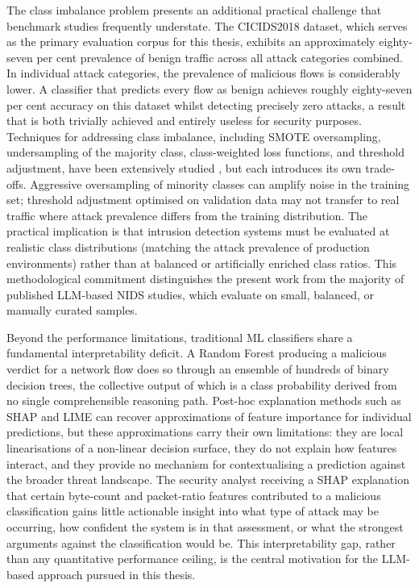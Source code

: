 \documentclass[../main.tex]{subfiles}
\begin{document}
The class imbalance problem presents an additional practical challenge that benchmark studies frequently understate. The CICIDS2018 dataset, which serves as the primary evaluation corpus for this thesis, exhibits an approximately eighty-seven per cent prevalence of benign traffic across all attack categories combined. In individual attack categories, the prevalence of malicious flows is considerably lower. A classifier that predicts every flow as benign achieves roughly eighty-seven per cent accuracy on this dataset whilst detecting precisely zero attacks, a result that is both trivially achieved and entirely useless for security purposes. Techniques for addressing class imbalance, including SMOTE oversampling, undersampling of the majority class, class-weighted loss functions, and threshold adjustment, have been extensively studied \autocite{Haixiang2017}, but each introduces its own trade-offs. Aggressive oversampling of minority classes can amplify noise in the training set; threshold adjustment optimised on validation data may not transfer to real traffic where attack prevalence differs from the training distribution. The practical implication is that intrusion detection systems must be evaluated at realistic class distributions (matching the attack prevalence of production environments) rather than at balanced or artificially enriched class ratios. This methodological commitment distinguishes the present work from the majority of published LLM-based NIDS studies, which evaluate on small, balanced, or manually curated samples.

Beyond the performance limitations, traditional ML classifiers share a fundamental interpretability deficit. A Random Forest producing a malicious verdict for a network flow does so through an ensemble of hundreds of binary decision trees, the collective output of which is a class probability derived from no single comprehensible reasoning path. Post-hoc explanation methods such as SHAP \autocite{Lundberg2017} and LIME \autocite{Ribeiro2016} can recover approximations of feature importance for individual predictions, but these approximations carry their own limitations: they are local linearisations of a non-linear decision surface, they do not explain how features interact, and they provide no mechanism for contextualising a prediction against the broader threat landscape. The security analyst receiving a SHAP explanation that certain byte-count and packet-ratio features contributed to a malicious classification gains little actionable insight into what type of attack may be occurring, how confident the system is in that assessment, or what the strongest arguments against the classification would be. This interpretability gap, rather than any quantitative performance ceiling, is the central motivation for the LLM-based approach pursued in this thesis.
\end{document}
